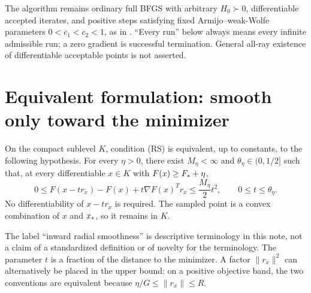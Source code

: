 The algorithm remains ordinary full BFGS with arbitrary $H_0\succ0$, differentiable accepted iterates, and positive steps satisfying fixed Armijo--weak-Wolfe parameters $0<c_1<c_2<1$, as in \cite{XW}. ``Every run'' below always means every infinite admissible run; a zero gradient is successful termination. General all-ray existence of differentiable acceptable points is not asserted.


\setcounter{section}{1}
\setcounter{theorem}{0}
\setcounter{equation}{1}
\section{Equivalent formulation: smooth only toward the minimizer}
\begin{theorem}\label{R:thm:equiv}
On the compact sublevel $K$, condition (RS) is equivalent, up to constants, to the following hypothesis. For every $\eta>0$, there exist $M_\eta<\infty$ and $\theta_\eta\in(0,1/2]$ such that, at every differentiable $x\in K$ with $F(x)\ge F_*+\eta$,
\begin{equation}
 0\le F(x-t r_x)-F(x)+t\nabla F(x)^Tr_x
 \le \frac{M_\eta}{2}t^2,
 \qquad 0\le t\le\theta_\eta.
 \tag{R.IR}\label{R:eq:IR}
\end{equation}
No differentiability of $x-t r_x$ is required. The sampled point is a convex combination of $x$ and $x_*$, so it remains in $K$.
\end{theorem}
The label ``inward radial smoothness'' is descriptive terminology in this note, not a claim of a standardized definition or of novelty for the terminology. The parameter $t$ is a fraction of the distance to the minimizer. A factor $\|r_x\|^2$ can alternatively be placed in the upper bound: on a positive objective band, the two conventions are equivalent because $\eta/G\le\|r_x\|\le R$.

